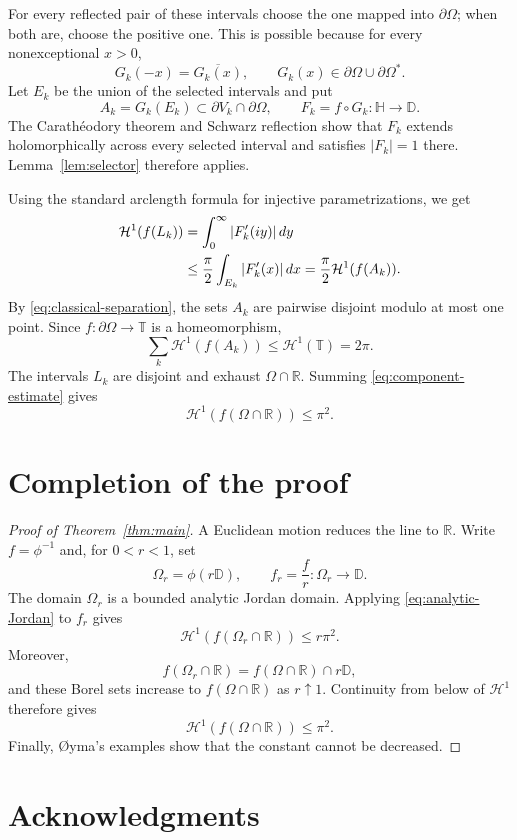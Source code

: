 \documentclass[11pt]{article}
\theoremstyle{remark}
\newcommand{\D}{\mathbb D}
\newcommand{\Hh}{\mathbb H}
\newcommand{\T}{\mathbb T}
\newcommand{\R}{\mathbb R}
\newcommand{\Haus}{\mathcal H^1}
\begin{document}
For every reflected pair of these intervals choose the one mapped into
$\partial\Omega$; when both are, choose the positive one. This is possible
because for every nonexceptional $x>0$,
\[
  G_k(-x)=\overline{G_k(x)},
  \qquad
  G_k(x)\in\partial\Omega\cup\partial\Omega^*.
\]
Let $E_k$ be the union of the selected intervals and put
\[
  A_k=G_k(E_k)\subset\partial V_k\cap\partial\Omega,
  \qquad
  F_k=f\circ G_k:\Hh\to\D.
\]
The Carath\'eodory theorem and Schwarz reflection show that $F_k$ extends
holomorphically across every selected interval and satisfies $|F_k|=1$ there.
Lemma~\ref{lem:selector} therefore applies.

Using the standard arclength formula for injective parametrizations, we get
\begin{align}
  \Haus(f(L_k))
  &=\int_0^\infty|F_k'(iy)|\,dy \notag\\
  &\le\frac\pi2\int_{E_k}|F_k'(x)|\,dx
   =\frac\pi2\Haus(f(A_k)).
  \label{eq:component-estimate}
\end{align}
By \eqref{eq:classical-separation}, the sets $A_k$ are pairwise disjoint
modulo at most one point. Since $f:\partial\Omega\to\T$ is a homeomorphism,
\[
  \sum_k\Haus(f(A_k))\le\Haus(\T)=2\pi.
\]
The intervals $L_k$ are disjoint and exhaust $\Omega\cap\R$. Summing
\eqref{eq:component-estimate} gives
\begin{equation}\label{eq:analytic-Jordan}
  \Haus(f(\Omega\cap\R))\le\pi^2.
\end{equation}

\section{Completion of the proof}

\begin{proof}[Proof of Theorem~\ref{thm:main}]
A Euclidean motion reduces the line to $\R$. Write $f=\phi^{-1}$ and, for
$0<r<1$, set
\[
  \Omega_r=\phi(r\D),
  \qquad
  f_r=\frac fr:\Omega_r\to\D.
\]
The domain $\Omega_r$ is a bounded analytic Jordan domain. Applying
\eqref{eq:analytic-Jordan} to $f_r$ gives
\[
  \Haus(f(\Omega_r\cap\R))\le r\pi^2.
\]
Moreover,
\[
  f(\Omega_r\cap\R)
  =f(\Omega\cap\R)\cap r\D,
\]
and these Borel sets increase to $f(\Omega\cap\R)$ as $r\uparrow1$.
Continuity from below of $\Haus$ therefore gives
\[
  \Haus(f(\Omega\cap\R))\le\pi^2.
\]
Finally, {\O}yma's examples \cite{OymaConstant} show that the constant cannot
be decreased.
\end{proof}

\section*{Acknowledgments}
\end{document}
